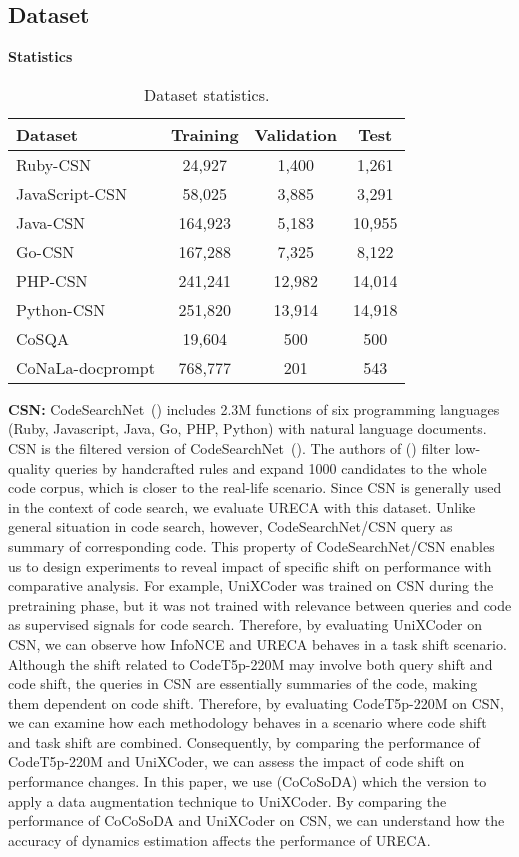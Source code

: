 \subsection{Dataset}

\textbf{Statistics}
\begin{table}[h]
\centering
\begin{tabular}{lccc}
\toprule
    Dataset & Training & Validation & Test \\\toprule
    Ruby-CSN & 24,927 & 1,400 & 1,261 \\
    JavaScript-CSN & 58,025 & 3,885 & 3,291 \\
    Java-CSN & 164,923 & 5,183 & 10,955 \\
    Go-CSN & 167,288 & 7,325 & 8,122 \\ 
    PHP-CSN & 241,241 & 12,982 & 14,014 \\
    Python-CSN & 251,820 & 13,914 & 14,918 \\\midrule
    CoSQA & 19,604 & 500 & 500 \\\midrule
    CoNaLa-docprompt & 768,777 & 201 & 543 \\\bottomrule
\end{tabular}%
\caption{Dataset statistics.}
\label{datastat}
\end{table}

\textbf{CSN:}                             
CodeSearchNet~(\cite{HusainWGAB19})  includes 2.3M functions of six programming languages 
(Ruby, Javascript, Java, Go, PHP, Python) with natural language documents.
CSN is the filtered version of CodeSearchNet~(\cite{HusainWGAB19}).
The authors of (\cite{HusainWGAB19}) filter low-quality queries by handcrafted rules and 
expand 1000 candidates to the whole code corpus, which is closer to the real-life scenario. 
Since CSN is generally used in the context of code search, we evaluate URECA with this dataset.
Unlike general situation in code search, however, CodeSearchNet/CSN query as summary of corresponding code.
This property of CodeSearchNet/CSN enables us to design experiments to reveal impact of specific shift 
on performance with comparative analysis.
For example, UniXCoder was trained on CSN during the pretraining phase, 
but it was not trained with relevance between queries and code as supervised signals for code search. 
Therefore, by evaluating UniXCoder on CSN, 
we can observe how InfoNCE and URECA behaves in a task shift scenario.
Although the shift related to CodeT5p-220M may involve both query shift and code shift, 
the queries in CSN are essentially summaries of the code, making them dependent on code shift. 
Therefore, by evaluating CodeT5p-220M on CSN, we can examine how each methodology behaves in a scenario 
where code shift and task shift are combined. 
Consequently, by comparing the performance of CodeT5p-220M and UniXCoder, 
we can assess the impact of code shift on performance changes.
In this paper, we use (CoCoSoDA\cite{EnshenYWLHSDH23}) which the version to apply a data augmentation technique to UniXCoder. 
By comparing the performance of CoCoSoDA and UniXCoder on CSN, 
we can understand how the accuracy of dynamics estimation affects the performance of URECA.

